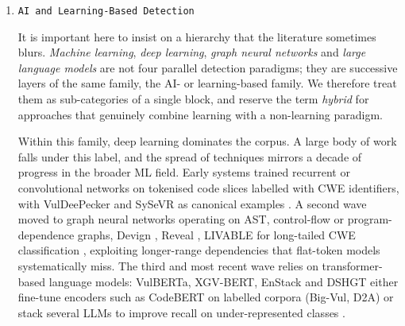 \begin{enumerate}
\begin{itemize}
  \item \textit{Web application security testing.} A distinct cluster
        of studies addresses vulnerabilities specific to the web stack,
        ranging from XSS and access-control flaws in cloud add-ons to
        parameter tampering and server-side request forgery. Recent
        entries in this cluster (e.g.\ Artemis on SSRF
        \citep{placeholder-artemis}, MalCodeAI on multi-class detection
        and remediation \citep{placeholder-malcodeai}) increasingly
        bridge into the learning-based and hybrid families discussed
        below, suggesting that classical web-AST tooling alone may have
        reached a plateau.

\end{itemize}

\item \texttt{AI and Learning-Based Detection}
\label{subsubsec:rw-ai}

It is important here to insist on a hierarchy that the literature
sometimes blurs. \emph{Machine learning}, \emph{deep learning},
\emph{graph neural networks} and \emph{large language models} are not
four parallel detection paradigms; they are successive layers of the
same family, the AI- or learning-based family. We therefore treat them
as sub-categories of a single block, and reserve the term
\emph{hybrid} for approaches that genuinely combine learning with a
non-learning paradigm.

Within this family, deep learning dominates the corpus. A large body
of work falls under this label, and the spread of techniques mirrors a
decade of progress in the broader ML field. Early systems trained
recurrent or convolutional networks on tokenised code slices labelled
with CWE identifiers, with VulDeePecker and SySeVR as canonical
examples \citep{placeholder-vuldeepecker,placeholder-sysevr}. A second
wave moved to graph neural networks operating on AST, control-flow or
program-dependence graphs, Devign \citep{placeholder-devign}, Reveal
\citep{placeholder-reveal}, LIVABLE for long-tailed CWE classification
\citep{placeholder-livable}, exploiting longer-range dependencies that
flat-token models systematically miss. The third and most recent wave
relies on transformer-based language models: VulBERTa, XGV-BERT,
EnStack and DSHGT either fine-tune encoders such as CodeBERT on
labelled corpora (Big-Vul, D2A) or stack several LLMs to improve
recall on under-represented classes
\citep{placeholder-vulberta,placeholder-xgvbert,placeholder-enstack,placeholder-dshgt}.


\end{enumerate}
